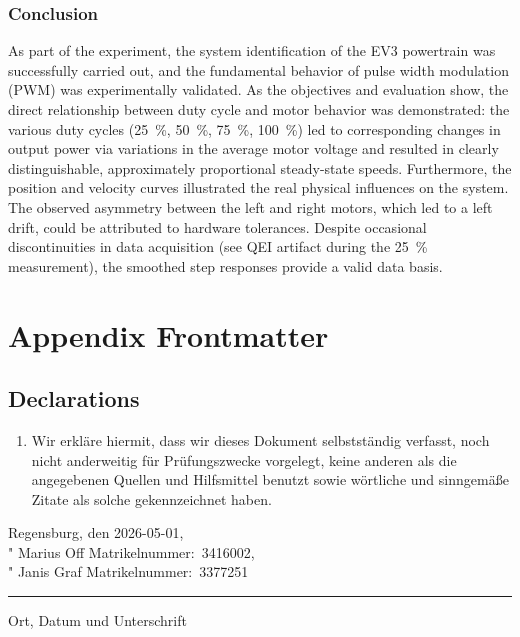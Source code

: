 \documentclass[12pt, oneside, a4paper]{scrreprt}
\begin{document}
            \cleardoublepage

            \subsection{Conclusion}\label{sec:Conclusion}

            As part of the experiment, the system identification of the EV3 powertrain was successfully carried out, and the fundamental behavior of pulse width modulation (PWM) was experimentally validated. As the objectives and evaluation show, the direct relationship between duty cycle and motor behavior was demonstrated: the various duty cycles (\SI{25}{\percent}, \SI{50}{\percent}, \SI{75}{\percent}, \SI{100}{\percent}) led to corresponding changes in output power via variations in the average motor voltage and resulted in clearly distinguishable, approximately proportional steady-state speeds. Furthermore, the position and velocity curves illustrated the real physical influences on the system. The observed asymmetry between the left and right motors, which led to a left drift, could be attributed to hardware tolerances. Despite occasional discontinuities in data acquisition (see QEI artifact during the \SI{25}{\percent} measurement), the smoothed step responses provide a valid data basis.





    \appendix
        
    \chapter{Appendix Frontmatter}

        \section{Declarations}\label{app:statutory}

            \begin{enumerate}
                \item Wir erkläre hiermit, dass wir dieses Dokument selbstständig verfasst, noch nicht anderweitig für Prüfungszwecke vorgelegt, keine anderen als die angegebenen Quellen und Hilfsmittel benutzt sowie wörtliche und sinngemäße Zitate als solche gekennzeichnet haben.
            \end{enumerate}

            \vskip22mm
            Regensburg, den 2026-05-01, \\
            "\hskip6cm Marius Off\hskip2cm Matrikelnummer:~3416002,\\
            "\hskip6cm Janis Graf\hskip2cm Matrikelnummer:~3377251
            \vskip1mm
            \hrule
            \vskip1mm
            {\footnotesize Ort, Datum und Unterschrift}
\end{document}
